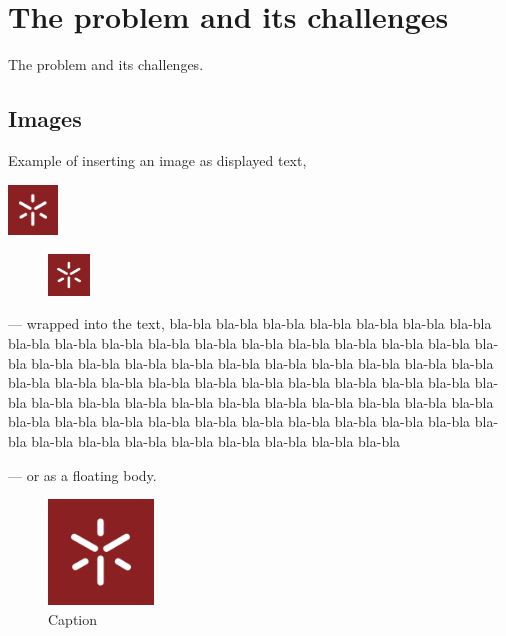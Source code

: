 \chapter{The problem and its challenges}

The problem and its challenges.

\section{Images}
Example of inserting an image as displayed text,
\begin{center}
	\includegraphics[width=0.1\textwidth]{images/UM.jpg}
\end{center}

\begin{figure}	
	\includegraphics[width=0.1\textwidth]{images/UM.jpg}
\end{figure}
\noindent --- wrapped into the text,
bla-bla bla-bla bla-bla bla-bla bla-bla bla-bla bla-bla bla-bla bla-bla bla-bla
bla-bla bla-bla bla-bla bla-bla bla-bla bla-bla bla-bla bla-bla bla-bla bla-bla
bla-bla bla-bla bla-bla bla-bla bla-bla bla-bla bla-bla bla-bla bla-bla bla-bla
bla-bla bla-bla bla-bla bla-bla bla-bla bla-bla bla-bla bla-bla bla-bla bla-bla
bla-bla bla-bla bla-bla bla-bla bla-bla bla-bla bla-bla bla-bla bla-bla bla-bla bla-bla bla-bla bla-bla bla-bla
bla-bla bla-bla bla-bla bla-bla bla-bla bla-bla bla-bla bla-bla bla-bla bla-bla bla-bla bla-bla bla-bla bla-bla

\noindent --- or as a floating body.
\begin{figure}
\begin{center}
	\includegraphics[width=0.25\textwidth]{images/UM.jpg}
\end{center}
\caption{Caption}
\end{figure}